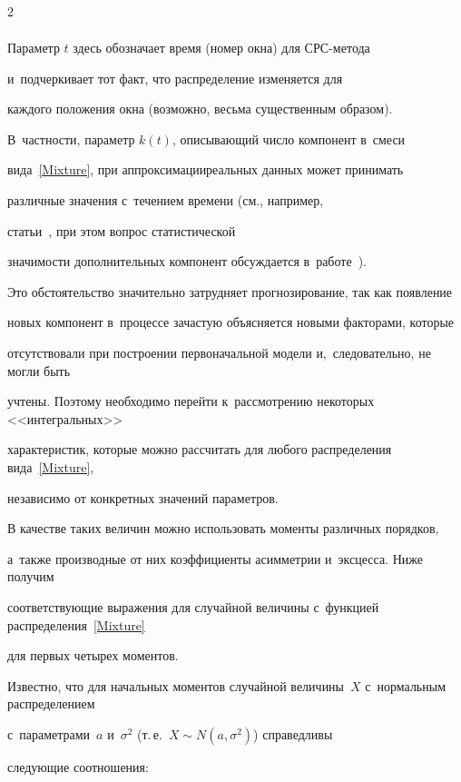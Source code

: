 \begin{multicols}{2}
\begin{multline}
\label{Mixture}

\end{multline}



Параметр $t$ здесь обозначает время (номер окна) для СРС-ме\-то\-да 

и~подчеркивает тот факт, что распределение изменяется для 

каждого положения окна (возможно, весьма существенным образом). 

В~частности, параметр $k(t)$, описывающий число компонент в~смеси 

вида~\eqref{Mixture}, при аппроксимации\linebreak реальных данных может принимать 

различные значения с~течением времени (см., например, 

\mbox{статьи}~\cite{Gorshenin2008,Gorshenin2012}, при этом вопрос статистической 

значимости дополнительных компонент обсуждается в~работе~\cite{Gorshenin2011b}). 

Это обстоятельство значительно затрудняет прогнозирование, так как появление 

новых компонент в~процессе зачастую объясняется новыми факторами, которые 

отсутствовали при построении первоначальной модели и,~следовательно, не могли быть 

учтены. Поэтому необходимо перейти к~рассмотрению некоторых <<интегральных>> 

характеристик, которые можно рассчитать для любого распределения вида~\eqref{Mixture}, 

независимо от конкретных значений параметров.



В качестве таких величин можно использовать моменты различных порядков, 

а~также производные от них коэффициенты асимметрии и~эксцесса. Ниже получим 

соответствующие выражения для случайной величины с~функцией распределения~\eqref{Mixture} 

для первых четырех моментов.



Известно, что для начальных моментов случайной величины~$X$ с~нормальным распределением 

с~параметрами~$a$ и~$\sigma^2$ (т.\,е.\ $X\sim N(a,\sigma^2)$) справедливы 

следующие соотношения:


\end{multicols}
